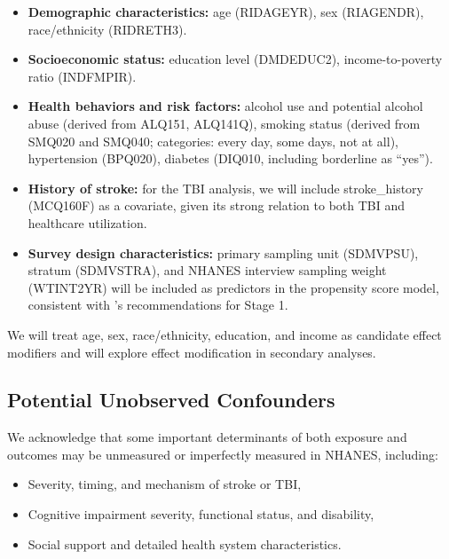\documentclass{article}
\begin{document}
\begin{itemize}
    \item \textbf{Demographic characteristics:} age (RIDAGEYR), sex (RIAGENDR), race/ethnicity (RIDRETH3).

    \item \textbf{Socioeconomic status:} education level (DMDEDUC2), income-to-poverty ratio (INDFMPIR).

    \item \textbf{Health behaviors and risk factors:} alcohol use and potential alcohol abuse (derived from ALQ151, ALQ141Q), smoking status (derived from SMQ020 and SMQ040; categories: every day, some days, not at all), hypertension (BPQ020), diabetes (DIQ010, including borderline as ``yes'').

    \item \textbf{History of stroke:} for the TBI analysis, we will include stroke\_history (MCQ160F) as a covariate, given its strong relation to both TBI and healthcare utilization.

    \item \textbf{Survey design characteristics:} primary sampling unit (SDMVPSU), stratum (SDMVSTRA), and NHANES interview sampling weight (WTINT2YR) will be included as predictors in the propensity score model, consistent with \citet{dugoff2014}'s recommendations for Stage 1.

\end{itemize}

We will treat age, sex, race/ethnicity, education, and income as candidate effect modifiers and will explore effect modification in secondary analyses.

\subsection{Potential Unobserved Confounders}

We acknowledge that some important determinants of both exposure and outcomes may be unmeasured or imperfectly measured in NHANES, including:

\begin{itemize}
    \item Severity, timing, and mechanism of stroke or TBI,

    \item Cognitive impairment severity, functional status, and disability,

    \item Social support and detailed health system characteristics.

\end{itemize}
\end{document}
